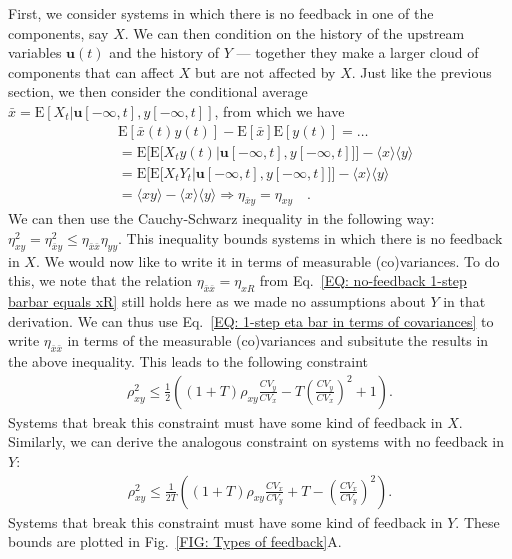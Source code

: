 \documentclass[%
 reprint,prx,
superscriptaddress,
%
%
%
%
%
%
%
%
%
 amsmath,amssymb,
 aps,
%
%
%
%
%
%
]{revtex4-2}
\newlength{\arrow}
\begin{document}
First, we consider systems in which there is no feedback in one of the components, say $X$. We can then condition on the history of the upstream variables $\mathbf{u}(t)$ 
and the history of $Y$ --- together they make a larger cloud of components that can affect $X$ but are not affected by $X$. Just like the previous section, we 
then consider the conditional average $\bar{x} = \mathrm{E}[X_{t}|\mathbf{u}[-\infty,t], y[-\infty,t]]$, from which we have
\begin{align*}
 &\mathrm{E}[\bar{x}(t)y(t)] - \mathrm{E}[\bar{x}]\mathrm{E}[y(t)] =\dots\\
 &= \mathrm{E}\Big[ \mathrm{E}\big[X_{t}y(t)|\mathbf{u}[-\infty,t], y[-\infty,t]\big] \Big] - \langle x \rangle \langle y \rangle \\
  &= \mathrm{E}\Big[ \mathrm{E}\big[X_{t}Y_{t}|\mathbf{u}[-\infty,t], y[-\infty,t]\big] \Big] - \langle x \rangle \langle y \rangle \\
  &= \langle xy \rangle - \langle x \rangle \langle y \rangle \Rightarrow \eta_{\bar{x}y} = \eta_{xy} \quad . 
\end{align*}
We can then use the Cauchy-Schwarz inequality in the following way: $\eta_{xy}^{2} = \eta_{\bar{x}y}^{2} \leq \eta_{\bar{x}\bar{x}}\eta_{yy}$. This inequality bounds systems in which there is no feedback in $X$. We would now like to write it in terms of measurable (co)variances. 
To do this, we note that the relation $\eta_{\bar{x}\bar{x}} = \eta_{xR}$ from Eq.~\eqref{EQ: no-feedback 1-step barbar equals xR} still holds here as we made no assumptions about 
$Y$ in that derivation. We can thus use Eq.~\eqref{EQ: 1-step eta bar in terms of covariances} to write $\eta_{\bar{x}\bar{x}}$ in terms of the measurable (co)variances 
and subsitute the results in the above inequality. This leads to the following constraint
\begin{align}
 \rho_{xy}^{2} \leq \frac{1}{2}\left( (1+T)\rho_{xy}\frac{CV_{y}}{CV_{x}} - T \left(\frac{CV_{y}}{CV_{x}}\right)^{2} + 1 \right)  .
 \label{EQ: no-feedback 1-step no feedback in X}
\end{align}
Systems that break this constraint must have some kind of feedback in $X$. Similarly, we can derive the analogous constraint on systems with no feedback in $Y$:
\begin{align}
 \rho_{xy}^{2} \leq \frac{1}{2T}\left( (1+T)\rho_{xy}\frac{CV_{x}}{CV_{y}} + T - \left(\frac{CV_{x}}{CV_{y}}\right)^{2} \right)  .
 \label{EQ: no-feedback 1-step no feedback in Y}
\end{align}
Systems that break this constraint must have some kind of feedback in $Y$. These bounds are plotted in Fig.~\ref{FIG: Types of feedback}A. 
\end{document}
